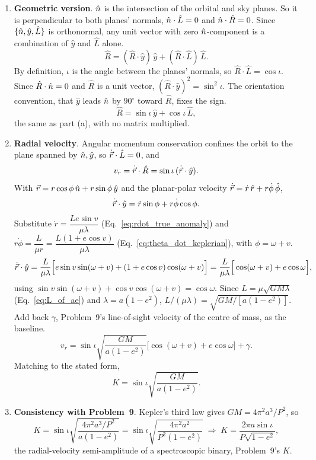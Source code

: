 \begin{enumerate}[label=(\alph*)]
	\item \textbf{Geometric version}. $\hat n$ is the intersection of the orbital and sky planes. So it is perpendicular to both planes' normals, $\hat n\cdot\hat L=0$ and $\hat n\cdot\hat R=0$. Since $\{\hat n,\hat y,\hat L\}$ is orthonormal, any unit vector with zero $\hat n$-component is a combination of $\hat y$ and $\hat L$ alone.
	\[
	\hat R = (\hat R\cdot\hat y)\,\hat y+(\hat R\cdot\hat L)\,\hat L.
	\]
	By definition, $\iota$ is the angle between the planes' normals, so $\hat R\cdot\hat L=\cos\iota$. Since $\hat R\cdot\hat n=0$ and $\hat R$ is a unit vector, $(\hat R\cdot\hat y)^2=\sin^2\iota$. The orientation convention, that $\hat y$ leads $\hat n$ by $90^\circ$ toward $\hat R$, fixes the sign.
	\[
	\boxed{\hat R=\sin\iota\,\hat y+\cos\iota\,\hat L,}
	\]
	the same as part (a), with no matrix multiplied.
	
	\item \textbf{Radial velocity}. Angular momentum conservation confines the orbit to the plane spanned by $\hat n,\hat y$, so $\dot{\vec r}\cdot\hat L=0$, and
	\[
	v_r=\dot{\vec r}\cdot\hat R = \sin\iota\,(\dot{\vec r}\cdot\hat y).
	\]
	With $\vec r=r\cos\phi\,\hat n+r\sin\phi\,\hat y$ and the planar-polar velocity $\dot{\vec r}=\dot r\,\hat r+r\dot\phi\,\hat\phi$,
	\[
	\dot{\vec r}\cdot\hat y = \dot r\sin\phi+r\dot\phi\cos\phi .
	\]
	Substitute $\dot r=\dfrac{Le\sin v}{\mu\lambda}$ (Eq.~\eqref{eq:rdot_true_anomaly}) and $r\dot\phi=\dfrac{L}{\mu r}=\dfrac{L(1+e\cos v)}{\mu\lambda}$ (Eq.~\eqref{eq:theta_dot_keplerian}), with $\phi=\omega+v$.
	\[
	\dot{\vec r}\cdot\hat y = \frac{L}{\mu\lambda}\Big[e\sin v\sin(\omega+v)+(1+e\cos v)\cos(\omega+v)\Big]
	=\frac{L}{\mu\lambda}\Big[\cos(\omega+v)+e\cos\omega\Big],
	\]
	using $\sin v\sin(\omega+v)+\cos v\cos(\omega+v)=\cos\omega$. Since $L=\mu\sqrt{GM\lambda}$ (Eq.~\eqref{eq:L_of_ae}) and $\lambda=a(1-e^2)$, $L/(\mu\lambda)=\sqrt{GM/[a(1-e^2)]}$. Add back $\gamma$, Problem~9's line-of-sight velocity of the centre of mass, as the baseline.
	\[
	v_r = \sin\iota\sqrt{\frac{GM}{a(1-e^2)}}\Big[\cos(\omega+v)+e\cos\omega\Big] + \gamma.
	\]
	Matching to the stated form,
	\[
	\boxed{K=\sin\iota\sqrt{\frac{GM}{a(1-e^2)}}.}
	\]
	
	\item \textbf{Consistency with Problem~9}. Kepler's third law gives $GM=4\pi^2a^3/P^2$, so
	\[
	K=\sin\iota\sqrt{\frac{4\pi^2a^3/P^2}{a(1-e^2)}}=\sin\iota\sqrt{\frac{4\pi^2a^2}{P^2(1-e^2)}}
	\;\Longrightarrow\;
	\boxed{K=\frac{2\pi a\sin\iota}{P\sqrt{1-e^2}},}
	\]
	the radial-velocity semi-amplitude of a spectroscopic binary, Problem~9's $K$.
\end{enumerate}

